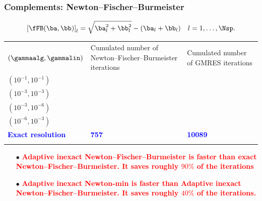 \documentclass[10 pt]{beamer}
\begin{document}
\begin{frame}
\frametitle{Complements: Newton--Fischer--Burmeister}
\textcolor{cadmiumgreen}{
\begin{equation*}
\left[\fFB (\ba, \bb)\right]_l = \sqrt{\ba_l^2 + \bb_l^2} - (\ba_l + \bb_l) \quad l=1,\ldots,\Nsp.
\end{equation*}
}
{\begin{table}
\centering
\begin{tabular}{lll}
\hline\noalign{\smallskip}
$\left(\gammaalg,\gammalin\right)$ & \hspace{-0.3 cm} \parbox{4.5 cm}{Cumulated number of Newton--Fischer--Burmeister iterations} &   \parbox{3.5 cm}{Cumulated number of GMRES  iterations}  \\
\noalign{\smallskip}\hline\noalign{\smallskip}
$\left(10^{-1},10^{-1} \right)$ &  & \quad {} \\
$\left(10^{-3},10^{-3}\right)$ &  & \quad {} \\
$\left(10^{-3},10^{-6}\right)$ &  & \quad {} \\
$\left(10^{-6},10^{-3}\right)$ &  & \quad {} \\
\textcolor{blue}{\textbf{Exact resolution}} & \qquad \textcolor{blue}{\textbf{757}} & \quad \hspace{0.2 cm} \quad \textcolor{blue}{\textbf{10089}} \\
\noalign{\smallskip}\hline
\end{tabular}
\end{table}
}

\normalsize
\begin{itemize}
\item[$\bullet$]  \textcolor{red}{\textbf{Adaptive inexact Newton--Fischer--Burmeister is faster than exact Newton--Fischer--Burmeister. It saves roughly $90 \%$  of the iterations}}
\item[$\bullet$] \textcolor{red}{\textbf{Adaptive inexact Newton-min is faster than Adaptive inexact Newton--Fischer--Burmeister. It saves roughly $40 \%$ of the iterations.}}
\end{itemize} 

\end{frame}
\end{document}
